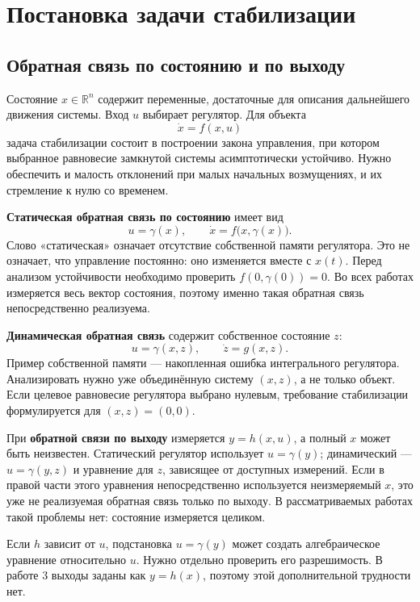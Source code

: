 \section{Постановка задачи стабилизации}
\label{sec:foundations}

\subsection{Обратная связь по состоянию и по выходу}

Состояние $x\in\mathbb R^n$ содержит переменные, достаточные для описания
дальнейшего движения системы. Вход $u$ выбирает регулятор. Для объекта
\[
  \dot x=f(x,u)
\]
задача стабилизации состоит в построении закона управления, при котором
выбранное равновесие замкнутой системы асимптотически устойчиво.
Нужно обеспечить и малость отклонений при малых начальных возмущениях,
и их стремление к нулю со временем.

\textbf{Статическая обратная связь по состоянию} имеет вид
\[
  u=\gamma(x),\qquad \dot x=f\bigl(x,\gamma(x)\bigr).
\]
Слово «статическая» означает отсутствие собственной памяти регулятора.
Это не означает, что управление постоянно: оно изменяется вместе с $x(t)$.
Перед анализом устойчивости необходимо проверить
$f(0,\gamma(0))=0$. Во всех работах измеряется весь вектор состояния,
поэтому именно такая обратная связь непосредственно реализуема.

\textbf{Динамическая обратная связь} содержит собственное состояние $z$:
\[
  u=\gamma(x,z),\qquad \dot z=g(x,z).
\]
Пример собственной памяти --- накопленная ошибка интегрального регулятора.
Анализировать нужно уже объединённую систему $(x,z)$, а не только объект.
Если целевое равновесие регулятора выбрано нулевым, требование стабилизации
формулируется для $(x,z)=(0,0)$.

При \textbf{обратной связи по выходу} измеряется $y=h(x,u)$, а полный $x$
может быть неизвестен. Статический регулятор использует $u=\gamma(y)$;
динамический --- $u=\gamma(y,z)$ и уравнение для $z$, зависящее от доступных
измерений. Если в правой части этого уравнения непосредственно используется
неизмеряемый $x$, это уже не реализуемая обратная связь только по выходу.
В рассматриваемых работах такой проблемы нет: состояние измеряется целиком.

\addition Если $h$ зависит от $u$, подстановка $u=\gamma(y)$ может создать
алгебраическое уравнение относительно $u$. Нужно отдельно проверить его
разрешимость. В работе 3 выходы заданы как $y=h(x)$, поэтому этой
дополнительной трудности нет.

